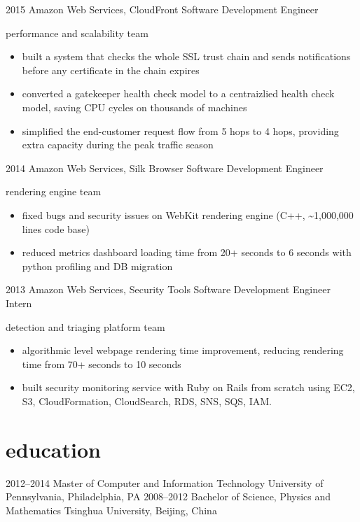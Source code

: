 \documentclass[]{friggeri-cv-a4}
\begin{document}
\begin{entrylist}
\entry
    {2015}
    {Amazon Web Services, CloudFront}
    {Software Development Engineer}
    {
      performance and scalability team
      \begin{itemize}
      \item built a system that checks the whole SSL trust chain and sends notifications before any certificate in the chain expires
      \item converted a gatekeeper health check model to a centraizlied health check model, saving CPU cycles on thousands of machines
      \item simplified the end-customer request flow from 5 hops to 4 hops, providing extra capacity during the peak traffic season
      \end{itemize}
    }
\entry
    {2014}
    {Amazon Web Services, Silk Browser}
    {Software Development Engineer}
    {rendering engine team
      \begin{itemize}
      \item fixed bugs and security issues on WebKit rendering engine (C++, \textasciitilde1,000,000 lines code base)
      \item reduced metrics dashboard loading time from 20+ seconds to 6 seconds with python profiling and DB migration
      \end{itemize}
    }
\entry
    {2013}
    {Amazon Web Services, Security Tools}
    {Software Development Engineer Intern}
    {
      detection and triaging platform team
      \begin{itemize}
      \item algorithmic level webpage rendering time improvement, reducing rendering time from 70+ seconds to 10 seconds
      \item built security monitoring service with Ruby on Rails from scratch using EC2, S3, CloudFormation, CloudSearch, RDS, SNS, SQS, IAM.
      \end{itemize}
    }
\end{entrylist}
\section{education}
\begin{entrylist}
\entry
    {2012--2014}
    {Master of Computer and Information Technology}
    {}
    {University of Pennsylvania, Philadelphia, PA}
\entry
    {2008--2012}
    {Bachelor of Science, Physics and Mathematics}
    {}
    {Tsinghua University, Beijing, China}
\end{entrylist}
\end{document}
